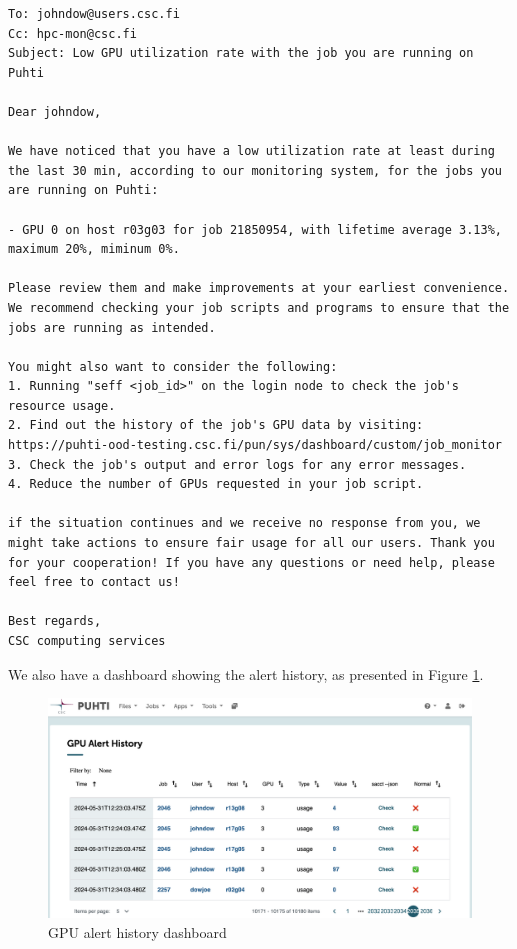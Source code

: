\begin{verbatim}
To: johndow@users.csc.fi
Cc: hpc-mon@csc.fi
Subject: Low GPU utilization rate with the job you are running on Puhti

Dear johndow,

We have noticed that you have a low utilization rate at least during the last 30 min, according to our monitoring system, for the jobs you are running on Puhti:

- GPU 0 on host r03g03 for job 21850954, with lifetime average 3.13%, maximum 20%, miminum 0%.

Please review them and make improvements at your earliest convenience. We recommend checking your job scripts and programs to ensure that the jobs are running as intended.

You might also want to consider the following:
1. Running "seff <job_id>" on the login node to check the job's resource usage.
2. Find out the history of the job's GPU data by visiting: https://puhti-ood-testing.csc.fi/pun/sys/dashboard/custom/job_monitor
3. Check the job's output and error logs for any error messages.
4. Reduce the number of GPUs requested in your job script.

if the situation continues and we receive no response from you, we might take actions to ensure fair usage for all our users. Thank you for your cooperation! If you have any questions or need help, please feel free to contact us!

Best regards,
CSC computing services
\end{verbatim}

We also have a dashboard showing the alert history, as presented in Figure \ref{fig_history_dashboard}.

\begin{figure}[H]
    \centering
    \includegraphics[width=1.1\textwidth]{figures/history-dashboard.png}
    \caption{GPU alert history dashboard}
    \label{fig_history_dashboard}
\end{figure}
